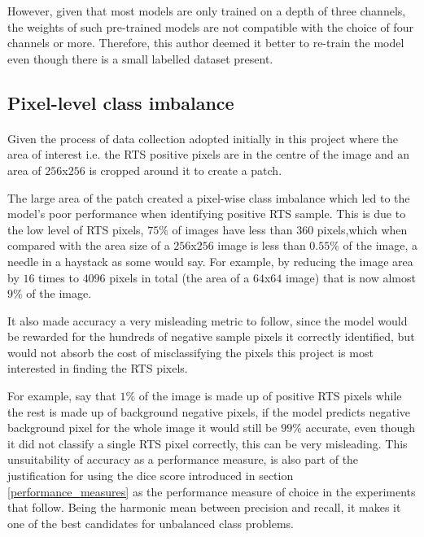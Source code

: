 However, given that most models are only trained on a depth of three channels, the weights of such pre-trained models are not compatible with the choice of four channels or more.
Therefore, this author deemed it better to re-train the model even though there is a small labelled dataset present.

\subsection{Pixel-level class imbalance} \label{class_imbalance}
\paragraph{}
Given the process of data collection adopted initially in this project where the area of interest i.e. the \gls{RTS} positive pixels are in the centre of the image and an area of $256$x$256$ is cropped around it to create a patch. 

The large area of the patch created a pixel-wise class imbalance which led to the model's poor performance when identifying positive \gls{RTS} sample. This is due to the low level of \gls{RTS} pixels, $75\%$ of images have less than $360$ pixels,which when compared with the area size of a $256$x$256$ image is less than $0.55\%$ of the image, a needle in a haystack as some would say. For example, by reducing the image area by $16$ times to $4096$ pixels in total (the area of a $64$x$64$ image) that is now almost $9\%$ of the image.

It also made accuracy a very misleading metric to follow, since the model would be rewarded for the hundreds of negative sample pixels it correctly identified, but would not absorb the cost of misclassifying the pixels this project is most interested in finding the \gls{RTS} pixels. 

For example, say that $1\%$ of the image is made up of positive \gls{RTS} pixels while the rest is made up of background negative pixels, if the model predicts negative background pixel for the whole image it would still be $99\%$ accurate, even though it did not classify a single \gls{RTS} pixel correctly, this can be very misleading.
This unsuitability of accuracy as a performance measure, is also part of the justification for using the dice score introduced in section \ref{performance_measures} as the performance measure of choice in the experiments that follow. Being the harmonic mean between precision and recall, it makes it one of the best candidates for unbalanced class problems.

